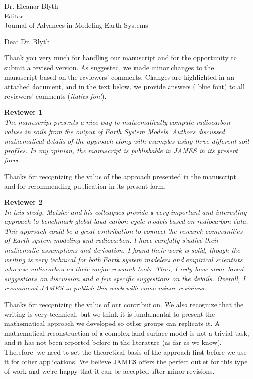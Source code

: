 \documentclass[11pt]{bgcletter}
\begin{document}
\begin{letter}{Dr. Eleanor Blyth\\
 Editor \\ Journal of Advances in Modeling Earth Systems}

\opening{Dear Dr. Blyth}
Thank you very much for handling our manuscript and for the opportunity to submit a revised version. As suggested, we made minor changes to the manuscript based on the reviewers' comments. Changes are highlighted in an attached document, and in the text below, we provide answers ({\color{blue} blue font}) to all reviewers' comments ({\it italics font}). 

{\bf Reviewer 1} \\
{\it The manuscript presents a nice way to mathematically compute radiocarbon values in soils from the output of Earth System Models. Authors discussed mathematical details of the approach along with examples using three different soil profiles. In my opinion, the manuscript is publishable in JAMES in its present form. }

{\color{blue} Thanks for recognizing the value of the approach presented in the manuscript and for recommending publication in its present form.}

{\bf Reviewer 2} \\
{\it In this study, Metzler and his colleagues provide a very important and interesting approach to benchmark global land carbon-cycle models based on radiocarbon data. This approach could be a great contribution to connect the research communities of Earth system modeling and radiocarbon. I have carefully studied their mathematic assumptions and derivation. I found their work is solid, though the writing is very technical for both Earth system modelers and empirical scientists who use radiocarbon as their major research tools. Thus, I only have some broad suggestions on discussion and a few specific suggestions on the details. Overall, I recommend JAMES to publish this work with some minor revisions. }

{\color{blue} Thanks for recognizing the value of our contribution. We also recognize that the writing is very technical, but we think it is fundamental to present the mathematical approach we developed so other groups can replicate it. A mathematical reconstruction of a complex land surface model is not a trivial task, and it has not been  reported before in the literature (as far as we know). Therefore, we need to set the theoretical basis of the approach first before we use it for other applications. We believe JAMES offers the perfect outlet for this type of work and we're happy that it can be accepted after minor revisions. }


\end{letter}
\end{document}
